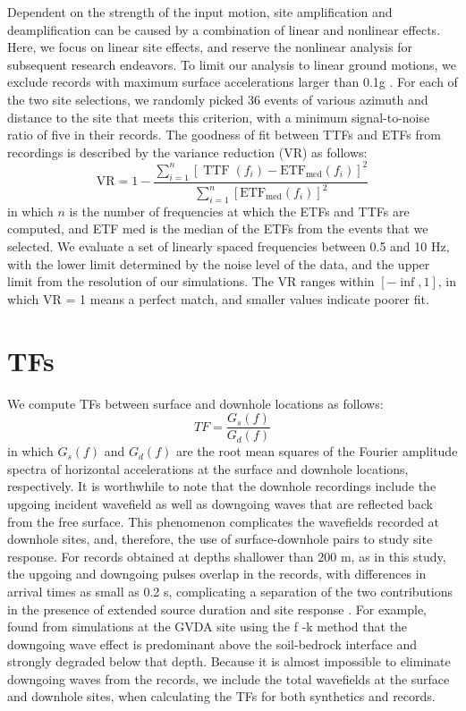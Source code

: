 {Dependent on the strength of the input motion, site amplification and deamplification can be caused by a combination of linear and nonlinear effects. Here, we focus on linear site effects, and reserve the nonlinear analysis for subsequent research endeavors. To limit our analysis to linear ground motions, we exclude records with maximum surface accelerations larger than 0.1g . For each of the two site selections, we randomly picked 36 events of various azimuth and distance to the site that meets this criterion, with a minimum signal-to-noise ratio of five in their records. The goodness of fit between TTFs and ETFs from recordings is described by the variance reduction (VR) as follows:
\begin{equation}\label{eq:etf-1}
  \mathrm{VR}=1-\frac{\sum_{i=1}^{n}\left[\operatorname{TTF}\left(f_{i}\right)-\mathrm{ETF}_{\mathrm{med}}\left(f_{i}\right)\right]^{2}}{\sum_{i=1}^{n}\left[\mathrm{ETF}_{\mathrm{med}}\left(f_{i}\right)\right]^{2}}
\end{equation}
\noindent in which $n$ is the number of frequencies at which the ETFs and TTFs are computed, and ETF med is the median of the ETFs from the events that we selected. We evaluate a set of linearly spaced frequencies between 0.5 and 10 Hz, with the lower limit determined by the noise level of the data, and the upper limit from the resolution of our simulations. The VR ranges within $[-\inf, 1]$, in which VR = 1 means a perfect match, and smaller values indicate poorer fit.


\section{TFs}\label{etf:tfs}
We compute TFs between surface and downhole locations as follows:
\begin{equation}\label{eq:etf-2}
  TF = \frac{G_s(f)}{G_d(f)}
\end{equation}
\noindent in which $G_s(f)$ and $G_d(f)$ are the root mean squares of the Fourier amplitude spectra of horizontal accelerations at the surface and downhole locations, respectively. It is worthwhile to note that the downhole recordings include the upgoing incident wavefield as well as downgoing waves that are reflected back from the free surface. This phenomenon complicates the wavefields recorded at downhole sites, and, therefore, the use of surface-downhole pairs to study site response. For records obtained at depths shallower than 200 m, as in this study, the upgoing and downgoing pulses overlap in the records, with differences in arrival times as small as 0.2 s, complicating a separation of the two contributions in the presence of extended source duration and site response \citep{shearerSurfaceNearsurfaceEffects1987}. For example, \citet{bonillaBoreholeResponseStudies2002}  found from simulations at the GVDA site using the f -k method that the downgoing wave effect is predominant above the soil-bedrock interface and strongly degraded below that depth. Because it is almost impossible to eliminate downgoing waves from the records, we include the total wavefields at the surface and downhole sites, when calculating the TFs for both synthetics and records.

}
